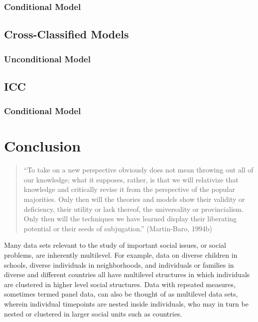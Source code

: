 \documentclass[
  letterpaper,
  DIV=11,
  numbers=noendperiod]{scrreprt}
\begin{document}
\subsection{Conditional Model}\label{conditional-model}

\section{Cross-Classified Models}\label{cross-classified-models}

\subsection{Unconditional Model}\label{unconditional-model-3}

\section{ICC}\label{icc-1}

\subsection{Conditional Model}\label{conditional-model-1}


\chapter{Conclusion}\label{conclusion}

\begin{quote}
``To take on a new perspective obviously does not mean throwing out all
of our knowledge; what it supposes, rather, is that we will relativize
that knowledge and critically revise it from the perspective of the
popular majorities. Only then will the theories and models show their
validity or deficiency, their utility or lack thereof, the universality
or provincialism. Only then will the techniques we have learned display
their liberating potential or their seeds of subjugation.''
(Martin-Baro, 1994b) 
\end{quote}

Many data sets relevant to the study of important social issues, or
social problems, are inherently multilevel. For example, data on diverse
children in schools, diverse individuals in neighborhoods, and
individuals or families in diverse and different countries all have
multilevel structures in which individuals are clustered in higher level
social structures. Data with repeated measures, sometimes termed panel
data, can also be thought of as multilevel data sets, wherein individual
timepoints are nested inside individuals, who may in turn be nested or
clustered in larger social units such as countries.
\end{document}
